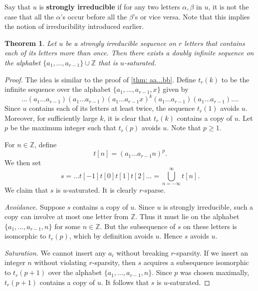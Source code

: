 \documentclass[12pt]{amsart}
\newcommand{\Z}{{\mathbb Z}}
\newtheorem{thm}{Theorem}
\theoremstyle{definition}
\numberwithin{equation}{section}
\numberwithin{table}{thm}
\begin{document}
Say that $u$ is \textbf{strongly irreducible} if for any two letters $\alpha,\beta$ in $u$, it is not the case that all the $\alpha$'s occur before all the $\beta$'s or vice versa. Note that this implies the notion of irreducibility introduced earlier.
\begin{thm}\label{thm: infinite sequences}
    Let $u$ be a strongly irreducible sequence on $r$ letters that contains each of its letters more than once. Then there exists a doubly infinite sequence on the alphabet $\{a_1,\dots,a_{r-1}\}\cup \Z$ that is $u$-saturated.
\end{thm}
\begin{proof}
    The idea is similar to the proof of \cref{thm: aa...bb}. Define $t_r(k)$ to be the infinite sequence over the alphabet $\{a_1,\dots, a_{r-1},x\}$ given by
    \[
    \dots (a_1\dots a_{r-1})(a_1\dots a_{r-1})(a_1\dots a_{r-1}x)^k (a_1\dots a_{r-1})(a_1\dots a_{r-1})\dots .
    \]
    Since $u$ contains each of its letters at least twice, the sequence $t_r(1)$ avoids $u$. Moreover, for sufficiently large $k$, it is clear that $t_r(k)$ contains a copy of $u$. Let $p$ be the maximum integer such that $t_r(p)$ avoids $u$. Note that $p\geq 1$.  
    
    For $n\in \mathbb Z$, define
    \[
    t[n] = (a_1\dots a_{r-1}n)^p.
    \]
    We then set
    \[
    s = \dots t[-1]t[0]t[1]t[2]\ldots = \bigcup_{n=-\infty}^\infty t[n].
    \]
    We claim that $s$ is $u$-saturated. It is clearly $r$-sparse.
    
    \smallskip \noindent\textit{Avoidance.} Suppose $s$ contains a copy of $u$. Since $u$ is strongly irreducible, such a copy can involve at most one letter from $\mathbb Z$. Thus it must lie on the alphabet $\{a_1,\dots, a_{r-1},n\}$ for some $n\in\mathbb Z$. But the subsequence of $s$ on these letters is isomorphic to $t_r(p)$, which by definition avoids $u$. Hence $s$ avoids $u$.
    
    \smallskip \noindent\textit{Saturation.} We cannot insert any $a_i$ without breaking $r$-sparsity. If we insert an integer $n$ without violating $r$-sparsity, then $s$ acquires a subsequence isomorphic to $t_r(p+1)$ over the alphabet $\{a_1,\dots, a_{r-1},n\}$. Since $p$ was chosen maximally, $t_r(p+1)$ contains a copy of $u$. It follows that $s$ is $u$-saturated.
\end{proof}
\end{document}
